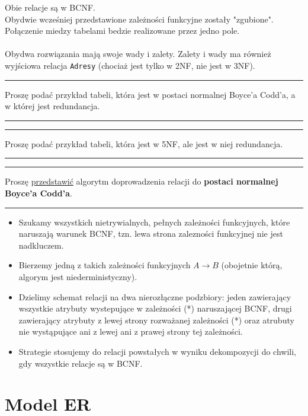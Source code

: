 \documentclass[a5paper,6pt]{article}
\newcommand{\horrule}[1]{\rule{\linewidth}{#1}}
\begin{document}
    Obie relacje są w BCNF.\\
    Obydwie wcześniej przedstawione zależności funkcyjne zostały "zgubione".
    Połączenie miedzy tabelami bedzie realizowane przez jedno pole.\\\\

    Obydwa rozwiązania mają swoje wady i zalety. Zalety i wady ma również
    wyjściowa relacja \texttt{Adresy} (chociaż jest tylko w 2NF, nie jest w
    3NF).

    \horrule{0.5pt}
    Proszę podać przykład tabeli, która jest w postaci normalnej Boyce’a Codd’a,
    a w której jest redundancja.\\
    \horrule{0.5pt}

    \horrule{0.5pt}
    Proszę podać przykład tabeli, która jest w 5NF, ale jest w niej
    redundancja.\\
    \horrule{0.5pt}

    \horrule{0.5pt}
    Proszę \underline{przedstawić} algorytm doprowadzenia relacji do
    \textbf{postaci normalnej Boyce’a Codd’a}.\\
    \horrule{0.5pt}

    \begin{itemize}
        \item Szukamy wszystkich nietrywialnych, pełnych zależności funkcyjnych,
              które naruszają warunek BCNF, tzn. lewa strona zalezności
              funkcyjnej nie jest nadkluczem.
        \item Bierzemy jedną z takich zależności funkcyjnych $A \rightarrow B$
              (obojetnie którą, algorym jest niederministyczny).
        \item Dzielimy schemat relacji na dwa nierozłączne podzbiory:
              jeden zawierający wszystkie atrybuty wystepujące w zależności (*)
              naruszającej BCNF,
              drugi zawierający atrybuty z lewej strony rozważanej zależności
              (*) oraz atrubuty nie wystąpujące ani z lewej ani z prawej strony
              tej zależności.
        \item Strategie stosujemy do relacji powstałych w wyniku dekompozycji
              do chwili, gdy wszystkie relacje są w BCNF.
    \end{itemize}


    \section{Model ER} %
    \label{sec:model_er}
\end{document}
